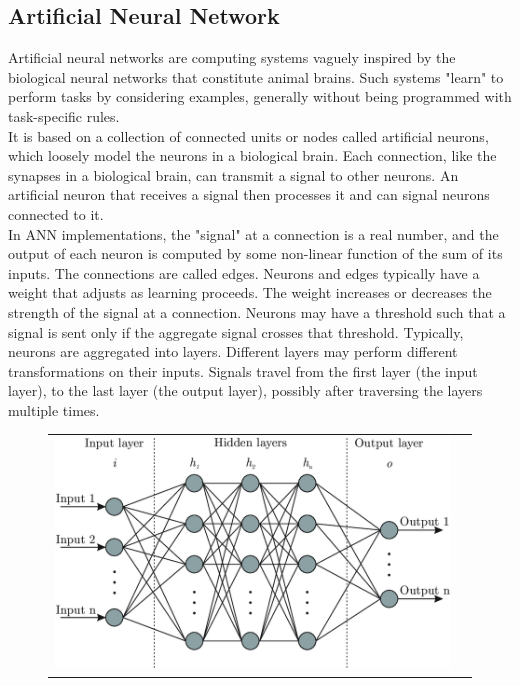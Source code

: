 \documentclass[12pt]{article}
\begin{document}
\subsection{Artificial Neural Network}
Artificial neural networks are computing systems vaguely inspired by the biological neural networks that constitute animal brains. Such systems "learn" to perform tasks by considering examples, generally without being programmed with task-specific rules. \\
It is based on a collection of connected units or nodes called artificial neurons, which loosely model the neurons in a biological brain. Each connection, like the synapses in a biological brain, can transmit a signal to other neurons. An artificial neuron that receives a signal then processes it and can signal neurons connected to it.\\
In ANN implementations, the "signal" at a connection is a real number, and the output of each neuron is computed by some non-linear function of the sum of its inputs. The connections are called edges. Neurons and edges typically have a weight that adjusts as learning proceeds. The weight increases or decreases the strength of the signal at a connection. Neurons may have a threshold such that a signal is sent only if the aggregate signal crosses that threshold. Typically, neurons are aggregated into layers. Different layers may perform different transformations on their inputs. Signals travel from the first layer (the input layer), to the last layer (the output layer), possibly after traversing the layers multiple times.\\
\begin{figure}[H]
\begin{tabular}{cc}
  \includegraphics[width=\textwidth]{ann.png}
\end{tabular}
\end{figure}
\end{document}
